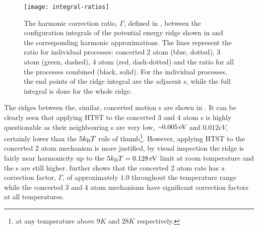 \begin{figure}[hb]
\begin{center}
\texttt{[image: integral-ratios]}
    \parbox{0.85\linewidth}{
\caption{
The harmonic correction ratio, $\Gamma$, defined in ,
between the configuration integrals of the potential energy ridge shown in  and the corresponding harmonic approximations.
The lines represent the ratio for individual processes: concerted 2 atom (blue, dotted), 3 atom (green, dashed), 4 atom (red, dash-dotted) and the ratio for all the processes combined (black, solid).
For the individual processes, the end points of the ridge integral are the adjacent s, while the full integral is done for the whole ridge.
}
\label{fig:integral-ratios}
}
\end{center}
\end{figure}

The ridges between the, similar, concerted motion s are shown in .
It can be clearly seen that applying HTST to the concerted 3 and 4 atom s is highly questionable as their neighbouring s are very low, $\mytilde 0.005\unit{eV}$ and $0.012\unit{eV}$, certainly lower than the $5k_\text{B} T$ rule of thumb\footnote{at any temperature above $9\unit{K}$ and $28\unit{K}$ respectively.}.
However, applying HTST to the concerted 2 atom mechanism is more justified, by visual inspection the ridge is fairly near harmonicity up to the $5k_\text{B} T = 0.128\, \mathrm{eV}$ limit at room temperature and the s are still higher.
 further shows that the concerted 2 atom rate has a correction factor, $\Gamma$, of approximately $1.0$ throughout the temperature range while the concerted 3 and 4 atom mechanisms have significant correction factors at all temperatures.

